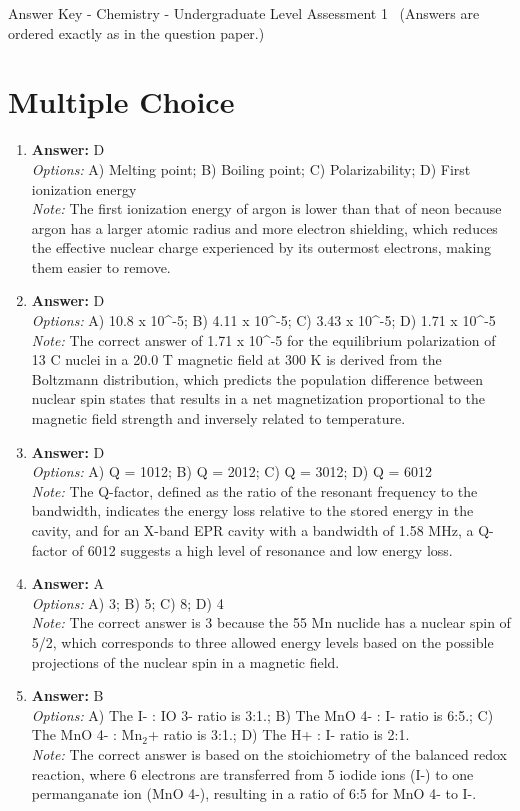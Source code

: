 \documentclass[12pt]{article}
\begin{document}
\begin{center}
Answer Key - Chemistry - Undergraduate Level Assessment 1 \
\small (Answers are ordered exactly as in the question paper.)
\end{center}

\section*{Multiple Choice}
\begin{enumerate}[label=\arabic*.]
\item \textbf{Answer:} D
\\ \textit{Options:} A) Melting point; B) Boiling point; C) Polarizability; D) First ionization energy
\\ \textit{Note:} The first ionization energy of argon is lower than that of neon because argon has a larger atomic radius and more electron shielding, which reduces the effective nuclear charge experienced by its outermost electrons, making them easier to remove.
\item \textbf{Answer:} D
\\ \textit{Options:} A) 10.8 x 10^-5; B) 4.11 x 10^-5; C) 3.43 x 10^-5; D) 1.71 x 10^-5
\\ \textit{Note:} The correct answer of 1.71 x 10^-5 for the equilibrium polarization of 13 C nuclei in a 20.0 T magnetic field at 300 K is derived from the Boltzmann distribution, which predicts the population difference between nuclear spin states that results in a net magnetization proportional to the magnetic field strength and inversely related to temperature.
\item \textbf{Answer:} D
\\ \textit{Options:} A) Q = 1012; B) Q = 2012; C) Q = 3012; D) Q = 6012
\\ \textit{Note:} The Q-factor, defined as the ratio of the resonant frequency to the bandwidth, indicates the energy loss relative to the stored energy in the cavity, and for an X-band EPR cavity with a bandwidth of 1.58 MHz, a Q-factor of 6012 suggests a high level of resonance and low energy loss.
\item \textbf{Answer:} A
\\ \textit{Options:} A) 3; B) 5; C) 8; D) 4
\\ \textit{Note:} The correct answer is 3 because the 55 Mn nuclide has a nuclear spin of 5/2, which corresponds to three allowed energy levels based on the possible projections of the nuclear spin in a magnetic field.
\item \textbf{Answer:} B
\\ \textit{Options:} A) The I- : IO 3- ratio is 3:1.; B) The MnO 4- : I- ratio is 6:5.; C) The MnO 4- : Mn$_{2}$+ ratio is 3:1.; D) The H+ : I- ratio is 2:1.
\\ \textit{Note:} The correct answer is based on the stoichiometry of the balanced redox reaction, where 6 electrons are transferred from 5 iodide ions (I-) to one permanganate ion (MnO 4-), resulting in a ratio of 6:5 for MnO 4- to I-.
\end{enumerate}
\end{document}
